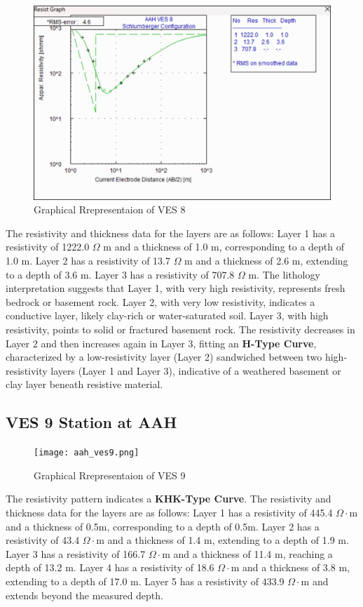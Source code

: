 \documentclass[12pt,a4paper]{report}
\begin{document}
\begin{figure}[H]
    \centering
    \includegraphics[width=1.0\textwidth]{aah_ves8.png}
    \caption{Graphical Rrepresentaion of VES 8}
    \label{fig:AAH_VES_8_Curve}
\end{figure}
The resistivity and thickness data for the layers are as follows: Layer 1 has a resistivity of 1222.0 $\Omega$ m and a thickness of 1.0 m, corresponding to a depth of 1.0 m. Layer 2 has a resistivity of 13.7 $\Omega$ m and a thickness of 2.6 m, extending to a depth of 3.6 m. Layer 3 has a resistivity of 707.8 $\Omega$ m. The lithology interpretation suggests that Layer 1, with very high resistivity, represents fresh bedrock or basement rock. Layer 2, with very low resistivity, indicates a conductive layer, likely clay-rich or water-saturated soil. Layer 3, with high resistivity, points to solid or fractured basement rock. The resistivity decreases in Layer 2 and then increases again in Layer 3, fitting an \textbf{H-Type Curve}, characterized by a low-resistivity layer (Layer 2) sandwiched between two high-resistivity layers (Layer 1 and Layer 3), indicative of a weathered basement or clay layer beneath resistive material.

\subsection{VES 9 Station at AAH}

\begin{figure}[H]
    \centering
    \texttt{[image: aah\_ves9.png]}
    \caption{Graphical Rrepresentaion of VES 9}
    \label{fig:AAH_VES_9_Curve}
\end{figure}
The resistivity pattern indicates a \textbf{KHK-Type Curve}. The resistivity and thickness data for the layers are as follows: Layer 1 has a resistivity of 445.4 $\Omega\cdot$m and a thickness of 0.5m, corresponding to a depth of 0.5m.  
Layer 2 has a resistivity of 43.4 $\Omega\cdot$m and a thickness of 1.4 m, extending to a depth of 1.9 m.  
Layer 3 has a resistivity of 166.7 $\Omega\cdot$m and a thickness of 11.4 m, reaching a depth of 13.2 m.  
Layer 4 has a resistivity of 18.6 $\Omega\cdot$m and a thickness of 3.8 m, extending to a depth of 17.0 m.  
Layer 5 has a resistivity of 433.9 $\Omega\cdot$m and extends beyond the measured depth.  
\end{document}
